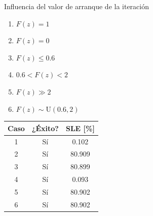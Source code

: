 \documentclass[11pt]{beamer}
\begin{document}
            \begin{frame}{Influencia del valor de arranque de la iteración}
                \begin{minipage}[c]{0.45\textwidth}
                    \justifying
                    \begin{enumerate}
                        \item $F(z) = 1$
                        \item $F(z) = 0$
                        \item $F(z) \leq 0.6$
                        \item $0.6 < F(z) < 2$            
                        \item $F(z) \gg 2$              
                        \item $F(z) \sim \text{U}(0.6, 2)$
                    \end{enumerate}
                \end{minipage}
                \hfill
                \begin{minipage}[c]{0.45\textwidth}
                    \centering
                    \begin{tabular}{|c|c|c|}
                        \hline
                        \textbf{Caso} & \textbf{¿Éxito?} & \textbf{SLE [\%]} \\ \hline \hline
                        1 & Sí &  0.102 \\ \hline
                        2 & Sí & 80.909 \\ \hline
                        3 & Sí & 80.899 \\ \hline
                        4 & Sí &  0.093 \\ \hline
                        5 & Sí & 80.902 \\ \hline
                        6 & Sí & 80.902 \\ \hline
                    \end{tabular}
                \end{minipage}
            \end{frame}
\end{document}
